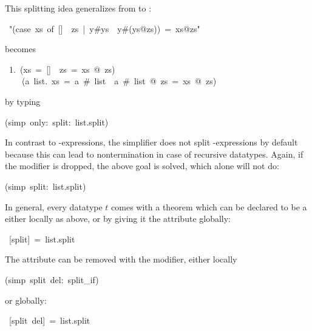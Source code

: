 \begin{isabelle}
\begin{isamarkuptext}
This splitting idea generalizes from  to :%
\end{isamarkuptext}%
~{"}(case~xs~of~[]~{\isasymRightarrow}~zs~|~y\#ys~{\isasymRightarrow}~y\#(ys@zs))~=~xs@zs{"}%
\begin{isamarkuptxt}%
\noindent
becomes
\begin{isabellepar}%
~1.~(xs~=~[]~{\isasymlongrightarrow}~zs~=~xs~@~zs)~{\isasymand}\isanewline
~~~~({\isasymforall}a~list.~xs~=~a~\#~list~{\isasymlongrightarrow}~a~\#~list~@~zs~=~xs~@~zs)%
\end{isabellepar}%
by typing%
\end{isamarkuptxt}%
(simp~only:~split:~list.split)%
\begin{isamarkuptext}%
\noindent
In contrast to -expressions, the simplifier does not split
-expressions by default because this can lead to nontermination
in case of recursive datatypes. Again, if the  modifier is
dropped, the above goal is solved, which 
alone will not do:%
\end{isamarkuptext}%
(simp~split:~list.split)%
\begin{isamarkuptext}%
In general, every datatype $t$ comes with a theorem
 which can be declared to be a  either
locally as above, or by giving it the  attribute globally:%
\end{isamarkuptext}%
~[split]~=~list.split%
\begin{isamarkuptext}%
\noindent
The  attribute can be removed with the  modifier,
either locally%
\end{isamarkuptext}%
(simp~split~del:~split\_if)%
\begin{isamarkuptext}%
\noindent
or globally:%
\end{isamarkuptext}%
~[split~del]~=~list.split\isanewline
\end{isabelle}%
